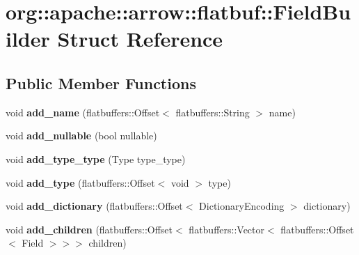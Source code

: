 \hypertarget{structorg_1_1apache_1_1arrow_1_1flatbuf_1_1FieldBuilder}{}\section{org\+:\+:apache\+:\+:arrow\+:\+:flatbuf\+:\+:Field\+Builder Struct Reference}
\label{structorg_1_1apache_1_1arrow_1_1flatbuf_1_1FieldBuilder}
\subsection*{Public Member Functions}
\begin{DoxyCompactItemize}
\item 
void {\bfseries add\+\_\+name} (flatbuffers\+::\+Offset$<$ flatbuffers\+::\+String $>$ name)\hypertarget{structorg_1_1apache_1_1arrow_1_1flatbuf_1_1FieldBuilder_af381daf7e4c2463da3fc06bd475defb0}{}\label{structorg_1_1apache_1_1arrow_1_1flatbuf_1_1FieldBuilder_af381daf7e4c2463da3fc06bd475defb0}

\item 
void {\bfseries add\+\_\+nullable} (bool nullable)\hypertarget{structorg_1_1apache_1_1arrow_1_1flatbuf_1_1FieldBuilder_a088e90e58a21fe87526244aa7311ce1a}{}\label{structorg_1_1apache_1_1arrow_1_1flatbuf_1_1FieldBuilder_a088e90e58a21fe87526244aa7311ce1a}

\item 
void {\bfseries add\+\_\+type\+\_\+type} (Type type\+\_\+type)\hypertarget{structorg_1_1apache_1_1arrow_1_1flatbuf_1_1FieldBuilder_a07b5e43a40d8268a7142e86c0bedb4a3}{}\label{structorg_1_1apache_1_1arrow_1_1flatbuf_1_1FieldBuilder_a07b5e43a40d8268a7142e86c0bedb4a3}

\item 
void {\bfseries add\+\_\+type} (flatbuffers\+::\+Offset$<$ void $>$ type)\hypertarget{structorg_1_1apache_1_1arrow_1_1flatbuf_1_1FieldBuilder_ae290ac8dc2f9df3a4f0404e446da1ae6}{}\label{structorg_1_1apache_1_1arrow_1_1flatbuf_1_1FieldBuilder_ae290ac8dc2f9df3a4f0404e446da1ae6}

\item 
void {\bfseries add\+\_\+dictionary} (flatbuffers\+::\+Offset$<$ Dictionary\+Encoding $>$ dictionary)\hypertarget{structorg_1_1apache_1_1arrow_1_1flatbuf_1_1FieldBuilder_aa7d4fec746ead30e581f0f6b44c42ece}{}\label{structorg_1_1apache_1_1arrow_1_1flatbuf_1_1FieldBuilder_aa7d4fec746ead30e581f0f6b44c42ece}

\item 
void {\bfseries add\+\_\+children} (flatbuffers\+::\+Offset$<$ flatbuffers\+::\+Vector$<$ flatbuffers\+::\+Offset$<$ Field $>$$>$$>$ children)\hypertarget{structorg_1_1apache_1_1arrow_1_1flatbuf_1_1FieldBuilder_ac65742e946e03ccbb1f299bbc1813557}{}\label{structorg_1_1apache_1_1arrow_1_1flatbuf_1_1FieldBuilder_ac65742e946e03ccbb1f299bbc1813557}


\end{DoxyCompactItemize}
